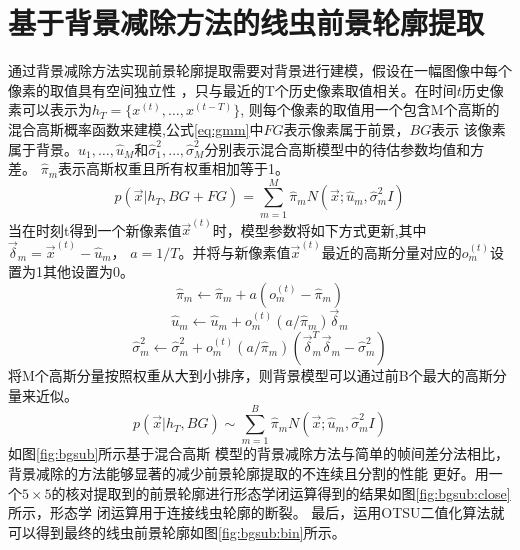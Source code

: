 \section{基于背景减除方法的线虫前景轮廓提取}
	通过背景减除方法实现前景轮廓提取需要对背景进行建模，假设在一幅图像中每个像素的取值具有空间独立性
	，只与最近的T个历史像素取值相关。在时间$t$历史像素可以表示为$h_T=\{x^{(t)},\dots,x^{(t-T)}\}$,
	则每个像素的取值用一个包含M个高斯的混合高斯概率函数来建模,公式\ref{eq:gmm}中$FG$表示像素属于前景，$BG$表示
	该像素属于背景。$\hat{u}_1,\dots,\hat{u}_M$和$\hat{\sigma}_1^2,\dots,\hat{\sigma}_M^2$分别表示混合高斯模型中的待估参数均值和方差。
	$\hat{\pi}_m$表示高斯权重且所有权重相加等于1。
	\begin{equation}
		p(\vec{x}|h_T,BG+FG)= \sum_{m=1}^{M} \hat{\pi}_{m}N(\vec{x};\hat{u}_m,\hat{\sigma}_m^2I)\label{eq:gmm}
	\end{equation}
	当在时刻t得到一个新像素值$\vec{x}^{(t)}$时，模型参数将如下方式更新,其中$\vec{\delta}_m=\vec{x}^{(t)}-\hat{u}_m$，
	$a=1/T$。并将与新像素值$\vec{x}^{(t)}$最近的高斯分量对应的$o_m^{(t)}$设置为1其他设置为0。
	\begin{equation}
		\hat{\pi}_m \leftarrow \hat{\pi}_m +a(o_m^{(t)}-\hat{\pi}_m) \label{eq:updata}
	\end{equation}
	\begin{equation}
		\hat{u}_m \leftarrow \hat{u}_m +o_m^{(t)}(a/\hat{\pi}_m)\vec{\delta}_m \label{eq:updata1}
	\end{equation}
	\begin{equation}
		\hat{\sigma}_m^2 \leftarrow \hat{\sigma}_m^2 +o_m^{(t)}(a/\hat{\pi}_m)(\vec{\delta}_m^T\vec{\delta}_m-\hat{\sigma}_m^2) \label{eq:updata2}
	\end{equation}
	将M个高斯分量按照权重从大到小排序，则背景模型可以通过前B个最大的高斯分量来近似。
	\begin{equation}
		p(\vec{x}|h_T,BG) \sim \sum_{m=1}^{B} \hat{\pi}_{m}N(\vec{x};\hat{u}_m,\hat{\sigma}_m^2I)\label{eq:bg}
	\end{equation}
	如图\ref{fig:bgsub}所示基于混合高斯
	模型的背景减除方法与简单的帧间差分法相比，背景减除的方法能够显著的减少前景轮廓提取的不连续且分割的性能
	更好。用一个$5\times5$的核对提取到的前景轮廓进行形态学闭运算得到的结果如图\ref{fig:bgsub:close}所示，形态学
	闭运算用于连接线虫轮廓的断裂。
	最后，运用OTSU二值化算法就可以得到最终的线虫前景轮廓如图\ref{fig:bgsub:bin}所示。

